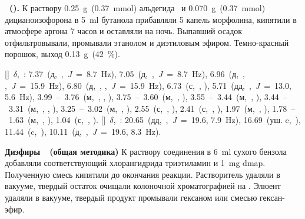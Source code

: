 \textbf{~().} К раствору \SI{0.25}{\gram}~(\SI{0.37}{\mmol}) альдегида~\textbf{} и \SI{0.070}{\gram}~(\SI{0.37}{\mmol}) дицианоизофорона в \SI{5}{\milli\litre} бутанола прибавляли 5 капель морфолина, кипятили в атмосфере аргона 7 часов и оставляли на ночь. Выпавший осадок отфильтровывали, промывали этанолом и диэтиловым эфиром. Темно-красный порошок, выход \SI{0.13}{\gram}~(\SI{42}{\percent}).
\begin{experimental}
    []~$\delta$,~\si{\ppm}: 7.37~(д,~,~\textit{J}~=~8.7~\si{\hertz}), 7.05~(д,~,~\textit{J}~=~8.7~\si{\hertz}), 6.96~(д,~, ,~\textit{J}~=~15.9~\si{\hertz}), 6.80~(д,~, ,~\textit{J}~=~15.9~\si{\hertz}), 6.73~(с,~, ), 5.71~(дд,~,~\textit{J}~=~13.0, 5.6~\si{\hertz}), 3.99~--~3.76~(м,~, , ), 3.75~--~3.60~(м,~, ), 3.55~--~3.44~(м,~, ), 3.44~--~3.31~(м,~, , ), 3.25~--~3.02~(м,~, ), 2.55~(с,~, ), 2.41~(с,~, ), 1.97~(м,~, ), 1.78~--~1.63~(м,~, ), 1.04~(с,~, ).
    []~$\delta$,~\si{\ppm}: 20.65~(дд,~,~\textit{J}~=~19.6, 7.9~\si{\hertz}), 16.69~(уш. c,~), 11.44~(c,~), 10.11~(д,~,~\textit{J}~=~19.6, 8.3~\si{\hertz}).
\end{experimental}


\textbf{Диэфиры~~(общая методика)}
К раствору соединения  в \SI{6}{\milli\litre} сухого бензола добавляли соответствующий хлорангидрида триэтиламин и \SI{1}{\milli\gram} \ac{dmap}.
Полученную смесь кипятили до окончания реакции.
Растворитель удаляли в вакууме, твердый остаток очищали колоночной хроматографией на .
Элюент удаляли в вакууме, твердый продукт промывали гексаном или смесью гексан-эфир.


